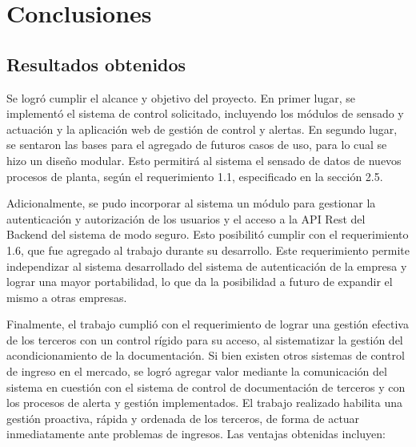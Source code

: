 
\chapter{Conclusiones} %

\label{Chapter5} %




\section{Resultados obtenidos}

Se logró cumplir el alcance y objetivo del proyecto. En primer lugar, se implementó el sistema de control solicitado, incluyendo los módulos de sensado y actuación y la aplicación web de gestión de control y alertas. En segundo lugar, se sentaron las bases para el agregado de futuros casos de uso, para lo cual se hizo un diseño modular. Esto permitirá al sistema el sensado de datos de nuevos procesos de planta, según el requerimiento 1.1, especificado en la sección 2.5.

Adicionalmente, se pudo incorporar al sistema un módulo para gestionar la autenticación y autorización de los usuarios y el acceso a la API Rest del Backend del sistema de modo seguro. Esto posibilitó cumplir con el requerimiento 1.6, que fue agregado al trabajo durante su desarrollo. Este requerimiento permite independizar al sistema desarrollado del sistema de autenticación de la empresa y lograr una mayor portabilidad, lo que da la posibilidad a futuro de expandir el mismo a otras empresas.

Finalmente, el trabajo cumplió con el requerimiento de lograr una gestión efectiva de los terceros con un control rígido para su acceso, al sistematizar la gestión del acondicionamiento de la documentación. Si bien existen otros sistemas de control de ingreso en el mercado, se logró agregar valor mediante la comunicación del sistema en cuestión con el sistema de control de documentación de terceros y con los procesos de alerta y gestión implementados. El trabajo realizado habilita una gestión proactiva, rápida y ordenada de los terceros, de forma de actuar inmediatamente ante problemas de ingresos. Las ventajas obtenidas incluyen:

